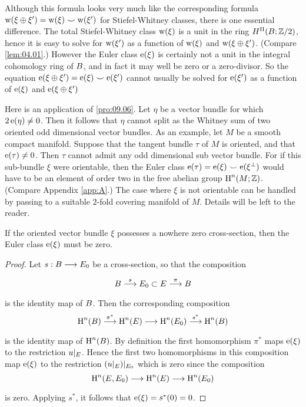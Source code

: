 \documentclass[../main]{subfiles}
\begin{document}
\begin{remark*}
Although this formula looks very much like the corresponding formula $\operatorname{w}(\xi \oplus \xi^{\prime})=\operatorname{w}(\xi) \smile \operatorname{w}(\xi^{\prime})$ for Stiefel-Whitney classes, there is one essential difference. The total Stiefel-Whitney class $\operatorname{w}(\xi)$ is a unit in the ring $H^{\Pi}(B ; \mathbb{Z} / 2)$, hence it is easy to solve for $\operatorname{w}(\xi^{\prime})$ as a function of $\operatorname{w}(\xi)$ and $\operatorname{w}(\xi \oplus \xi^{\prime})$. (Compare \ref{lem:04.01}.) However the Euler class $\operatorname{e}(\xi)$ is certainly not a unit in the integral cohomology ring of $B$, and in fact it may well be zero or a zero-divisor. So the equation $\operatorname{e}(\xi \oplus \xi^{\prime})=\operatorname{e}(\xi) \smile \operatorname{e}(\xi^{\prime})$ cannot usually be solved for $\operatorname{e}(\xi^{\prime})$ as a function of $\operatorname{e}(\xi)$ and $\operatorname{e}(\xi \oplus \xi^{\prime})$\end{remark*}

Here is an application of \ref{pro:09.06}. Let $\eta$ be a vector bundle for which $2 \operatorname{e}(\eta) \neq 0$. Then it follows that $\eta$ cannot split as the Whitney sum of two oriented odd dimensional vector bundles. As an example, let $M$ be a smooth compact manifold. Suppose that the tangent bundle $\tau$ of $M$ is oriented, and that $\operatorname{e}(\tau) \neq 0$. Then $\tau$ cannot admit any odd dimensional sub vector bundle. For if this sub-bundle $\xi$ were orientable, then the Euler class $\operatorname{e}(\tau)=\operatorname{e}(\xi) \smile \operatorname{e}(\xi^{\perp})$ would have to be an element of order two in the free abelian group $\operatorname{H}^{n}(M ; \mathbb{Z})$. (Compare Appendix \ref{app:A}.) The case where $\xi$ is not orientable can be handled by passing to a suitable $2$-fold covering manifold of $M$. Details will be left to the reader.

\begin{property}\label{pro:09.07} If the oriented vector bundle $\xi$ possesses a nowhere zero cross-section, then the Euler class $\operatorname{e}( \xi)$ must be zero.
\end{property}

\begin{proof} Let $s: \base \varrightarrow{} \total_{0}$ be a cross-section, so that the composition
\[
\base \varrightarrow{s} \total_{0} \subset \total \varrightarrow{\pi} \base
\]
is the identity map of $B$. Then the corresponding composition
\[
\homology^{n}(\base) \varrightarrow{\pi^{*}} \homology^{n}(\total) \longrightarrow \homology^{n}(\total_{0}) \varrightarrow{s^{*}} \homology^{n}(\base)
\]
is the identity map of $\operatorname{H}^{n}(B)$. By definition the first homomorphism $\pi^{*}$ maps $\operatorname{e}(\xi)$ to the restriction $u |_{E}$. Hence the first two homomorphisms in this composition map $\operatorname{e}(\xi)$ to the restriction $(u |_{E}) |_{ E_{0}}$ which is zero since the composition
\[
\homology^{n}(\total, \total_{0}) \varrightarrow{} \homology^{n}(\total) \varrightarrow{} \homology^{n}(\total_{0})
\]
is zero. Applying $s^{*}$, it follows that $\operatorname{e}(\xi)=s^{*}(0)=0$.

\end{proof}
\end{document}
